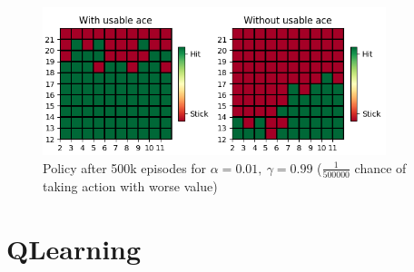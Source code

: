 \documentclass{article}
\begin{document}
    \begin{figure}[h]
        \centering
        \includegraphics[width=10cm]{plots/sarsa_policy_500k.png}
        \caption{Policy after 500k episodes for $\alpha=0.01,\ \gamma=0.99$ ($\frac{1}{500000}$ chance of taking action with worse value)}
    \end{figure}


    \section{QLearning}
\end{document}
